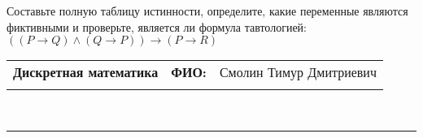 \documentclass[10pt]{exam}
\newcommand{\class}{Дискретная математика}
\newcommand{\examdate}{}
\begin{document}
\begin{questions}
\begin{enumerate}[a)]
\end{enumerate}\question Составьте полную таблицу истинности, определите, какие переменные являются фиктивными и проверьте, является ли формула тавтологией:
$(( P \rightarrow Q) \land (Q \rightarrow P)) \rightarrow (P \rightarrow R)$

\end{questions}
\newpage
\begin{flushright}
\begin{tabular}{p{2.8in} r l}
\textbf{\class} & \textbf{ФИО:} &Смолин Тимур Дмитриевич
\\

\textbf{\examdate} &&\\
\end{tabular}\\
\end{flushright}
\rule[1ex]{\textwidth}{.1pt}
\end{document}
